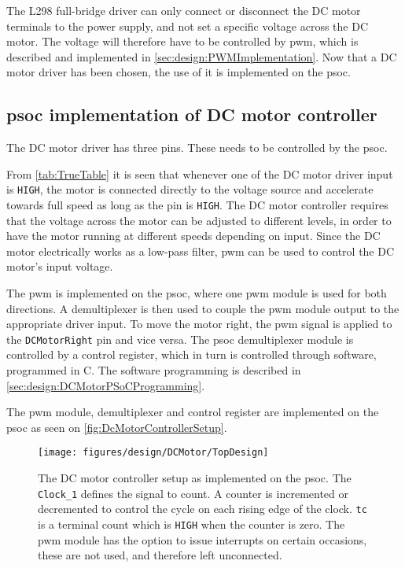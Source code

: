 The L298 full-bridge driver can only connect or disconnect the DC motor terminals to the power supply, and not set a specific voltage across the DC motor. The voltage will therefore have to be controlled by \gls{pwm}, which is described and implemented in \autoref{sec:design:PWMImplementation}. Now that a DC motor driver has been chosen, the use of it is implemented on the \gls{psoc}.


\subsection{\gls{psoc} implementation of DC motor controller}\label{sec:design:PWMImplementation}
The DC motor driver has three pins. These needs to be controlled by the \gls{psoc}. 

From \autoref{tab:TrueTable} it is seen that whenever one of the DC motor driver input is \texttt{HIGH}, the motor is connected directly to the voltage source and accelerate towards full speed as long as the pin is \texttt{HIGH}. The DC motor controller requires that the voltage across the motor can be adjusted to different levels, in order to have the motor running at different speeds depending on input. Since the DC motor electrically works as a low-pass filter, \gls{pwm} can be used to control the DC motor's input voltage.

The \gls{pwm} is implemented on the \gls{psoc}, where one \gls{pwm} module is used for both directions. A demultiplexer is then used to couple the \gls{pwm} module output to the appropriate driver input. To move the motor right, the \gls{pwm} signal is applied to the \texttt{DCMotorRight} pin and vice versa. The \gls{psoc} demultiplexer module is controlled by a control register, which in turn is controlled through software, programmed in C. The software programming is described in \autoref{sec:design:DCMotorPSoCProgramming}.

The \gls{pwm} module, demultiplexer and control register are implemented on the \gls{psoc} as seen on \autoref{fig:DcMotorControllerSetup}. 
\begin{figure}[h!]
    \centering
        \texttt{[image: figures/design/DCMotor/TopDesign]}
        \caption{The DC motor controller setup as implemented on the \gls{psoc}. The \texttt{Clock_1} defines the signal to count. A counter is incremented or decremented to control the cycle on each rising edge of the clock. \texttt{tc} is a terminal count which is \texttt{HIGH} when the counter is zero. The \gls{pwm} module has the option to issue interrupts on certain occasions, these are not used, and therefore left unconnected.}
        \label{fig:DcMotorControllerSetup}
\end{figure}

